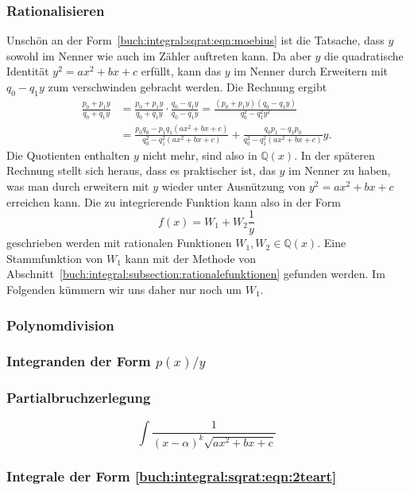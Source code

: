 \subsubsection{Rationalisieren}
Unschön an der Form~\eqref{buch:integral:sqrat:eqn:moebius} ist die
Tatsache, dass $y$ sowohl im Nenner wie auch im Zähler auftreten kann.
Da aber $y$ die quadratische Identität $y^2=ax^2+bx+c$ erfüllt,
kann das $y$ im Nenner durch Erweitern mit $q_0-q_1y$ zum verschwinden
gebracht werden.
Die Rechnung ergibt
\begin{align*}
\frac{p_0+p_1y}{q_0+q_1y}
&=
\frac{p_0+p_1y}{q_0+q_1y}
\cdot
\frac{q_0-q_1y}{q_0-q_1y}
=
\frac{(p_0+p_1y)(q_0-q_1y)}{q_0^2-q_1^2y^2}
\\
&=
\frac{p_0q_0-p_1q_1(ax^2+bx+c)}{q_0^2-q_1^2(ax^2+bx+c)}
+
\frac{q_0p_1-q_1p_0}{q_0^2-q_1^2(ax^2+bx+c)} y.
\end{align*}
Die Quotienten enthalten $y$ nicht mehr, sind also in $\mathbb{Q}(x)$.
In der späteren Rechnung stellt sich heraus, dass es praktischer ist,
das $y$ im Nenner zu haben, was man durch erweitern mit $y$ wieder
unter Ausnützung von $y^2=ax^2+bx+c$ erreichen kann.
Die zu integrierende Funktion  kann also in der Form
\begin{equation}
f(x)
=
W_1 + W_2\frac{1}{y}
\end{equation}
geschrieben werden mit rationalen Funktionen
$W_1,W_2\in\mathbb{Q}(x)$.
Eine Stammfunktion von $W_1$ kann mit der Methode von
Abschnitt~\ref{buch:integral:subsection:rationalefunktionen}
gefunden werden.
Im Folgenden kümmern wir uns daher nur noch um $W_1$.

\subsubsection{Polynomdivision}

\subsubsection{Integranden der Form $p(x)/y$}

\subsubsection{Partialbruchzerlegung}

\begin{equation}
\int
\frac{1}{(x-\alpha)^k \sqrt{ax^2+bx+c}}
\label{buch:integral:sqrat:eqn:2teart}
\end{equation}

\subsubsection{Integrale der Form \eqref{buch:integral:sqrat:eqn:2teart}}





